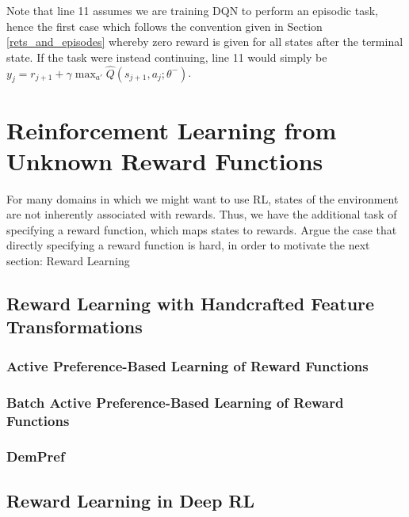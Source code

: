 \documentclass[11pt, a4paper, bibliography=totoc]{report}
\begin{document}
Note that line 11 assumes we are training DQN to perform an episodic task, hence the first case which follows the convention given in Section \ref{rets_and_episodes} whereby zero reward is given for all states after the terminal state. If the task were instead continuing, line 11 would simply be $ y_j = r_{j+1} + \gamma \max_{a'} \hat{Q}(s_{j+1}, a_j ; \theta^- ) $.


\section{Reinforcement Learning from Unknown Reward Functions}
For many domains in which we might want to use RL, states of the environment are not inherently associated with rewards.  Thus, we have the additional task of specifying a reward function, which maps states to rewards. Argue the case that directly specifying a reward function is hard, in order to motivate the next section: Reward Learning
\subsection{Reward Learning with Handcrafted Feature Transformations}

\subsubsection{Active Preference-Based Learning of Reward Functions}

\subsubsection{Batch Active Preference-Based Learning of Reward Functions}

\subsubsection{DemPref}
\subsection{Reward Learning in Deep RL}
\end{document}
